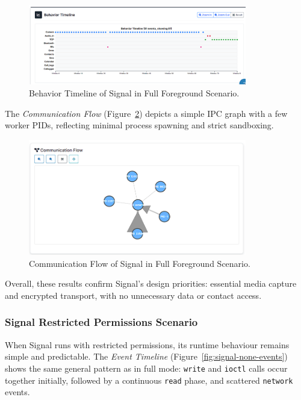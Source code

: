 \documentclass[a4paper,12pt]{report}
\begin{document}
\begin{figure}[H]
    \centering
    \includegraphics[width=0.85\textwidth]{signal-full-behav.png}
    \caption{Behavior Timeline of Signal in Full Foreground Scenario.}
    \label{fig:signal-full-behav}
\end{figure}

The \textit{Communication Flow} (Figure~\ref{fig:signal-full-flow}) depicts a simple IPC graph with a few worker PIDs, reflecting minimal process spawning and strict sandboxing.

\begin{figure}[H]
    \centering
    \includegraphics[width=0.85\textwidth]{signal-full-flow.png}
    \caption{Communication Flow of Signal in Full Foreground Scenario.}
    \label{fig:signal-full-flow}
\end{figure}

Overall, these results confirm Signal’s design priorities: essential media capture and encrypted transport, with no unnecessary data or contact access.

\subsubsection{Signal Restricted Permissions Scenario}

When Signal runs with restricted permissions, its runtime behaviour remains simple and predictable. The \textit{Event Timeline} (Figure~\ref{fig:signal-none-events}) shows the same general pattern as in full mode: \texttt{write} and \texttt{ioctl} calls occur together initially, followed by a continuous \texttt{read} phase, and scattered \texttt{network} events.
\end{document}

